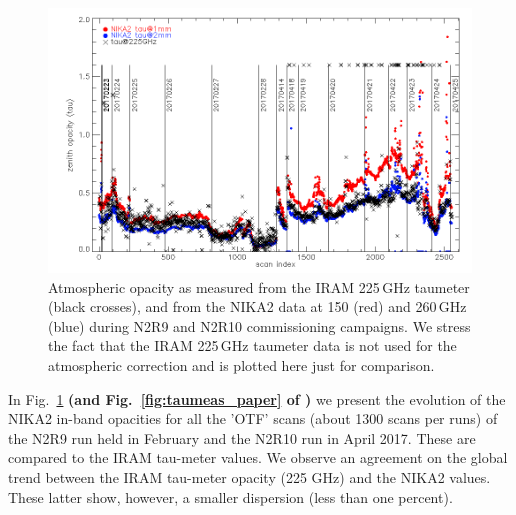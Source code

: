 \begin{figure}[ht]
\begin{center}
\includegraphics[width=\linewidth]{Figures/opacity_vs_index_N2R9_N2R10.png}
\caption[Zenith opacity monitoring during N2R9 and N2R10]{Atmospheric opacity as measured from the IRAM 225\,GHz
  taumeter (black crosses), and from the NIKA2 data at 150 (red) and 260\,GHz (blue) during 
  N2R9 and N2R10 commissioning campaigns.  We stress the fact that the IRAM 225\,GHz taumeter data is not used for the atmospheric correction and is plotted here just for comparison.
  \label{fig:taumeas}}
\end{center}
\end{figure}


In Fig.~\ref{fig:taumeas} {\bf(and Fig.~\ref{fig:taumeas_paper} of
  \cite{Adam18}) } we present the evolution of the NIKA2 in-band
opacities for all the 'OTF' scans (about 1300 scans per runs) of the
N2R9 run held in February and the N2R10 run in April 2017. These are
compared to the IRAM tau-meter values. We observe an agreement on the global trend between the IRAM tau-meter opacity (225 GHz) and the NIKA2 values. These latter show, however,
a smaller dispersion (less than one percent).


